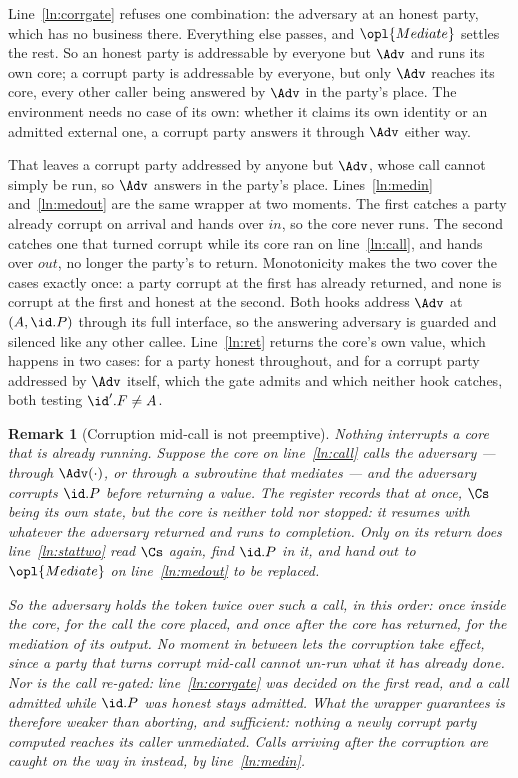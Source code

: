 \documentclass[10pt,oneside,openany]{book}
\theoremstyle{accentdef}
\newtheorem{remark}[definition]{Remark}
\theoremstyle{accentplain}
\begin{document}
Line~\ref{ln:corrgate} refuses one combination: the adversary at an honest party, which has no
business there. Everything else passes, and $\opl{Mediate}$ settles the rest. So an honest party
is addressable by everyone but $\Adv$ and runs its own core; a corrupt party is addressable by
everyone, but only $\Adv$ reaches its core, every other caller being answered by $\Adv$ in the
party's place. The environment needs no case of its own: whether it claims its own identity or an
admitted external one, a corrupt party answers it through $\Adv$ either way.

That leaves a corrupt party addressed by anyone but $\Adv$, whose call cannot simply be run, so
$\Adv$ answers in the party's place. Lines~\ref{ln:medin} and~\ref{ln:medout} are the same
wrapper at two moments. The first catches a party already corrupt on arrival and hands over
$in$, so the core never runs. The second catches one that turned corrupt while its core ran on
line~\ref{ln:call}, and hands over $out$, no longer the party's to return. Monotonicity makes
the two cover the cases exactly once: a party corrupt at the first has already returned, and none
is corrupt at the first and honest at the second. Both hooks address $\Adv$ at $(A,\id.P)$ through
its full interface, so the answering adversary is guarded and silenced like any other callee. Line~\ref{ln:ret} returns the core's own value, which happens in two cases: for
a party honest throughout, and for a corrupt party addressed by $\Adv$ itself, which the gate
admits and which neither hook catches, both testing $\id'.F \neq A$.

\begin{remark}[Corruption mid-call is not preemptive]\label{rem:midcall}
Nothing interrupts a core that is already running. Suppose the core on line~\ref{ln:call} calls
the adversary --- through $\Adv(\cdot)$, or through a subroutine that mediates --- and the
adversary corrupts $\id.P$ before returning a value. The register records that at once, $\Cs$
being its own state, but the core is neither told nor stopped: it resumes with whatever the
adversary returned and runs to completion. Only on its return does line~\ref{ln:stattwo} read
$\Cs$ again, find $\id.P$ in it, and hand $out$ to $\opl{Mediate}$ on line~\ref{ln:medout} to be
replaced.

So the adversary holds the token twice over such a call, in this order: once inside the core, for
the call the core placed, and once after the core has returned, for the mediation of its output.
No moment in between lets the corruption take effect, since a party that turns corrupt mid-call
cannot un-run what it has already done. Nor is the call re-gated: line~\ref{ln:corrgate} was
decided on the first read, and a call admitted while $\id.P$ was honest stays admitted. What the
wrapper guarantees is therefore weaker than aborting, and sufficient: nothing a newly corrupt
party computed reaches its caller unmediated. Calls arriving
\emph{after} the corruption are caught on the way in instead, by line~\ref{ln:medin}.
\end{remark}
\end{document}
